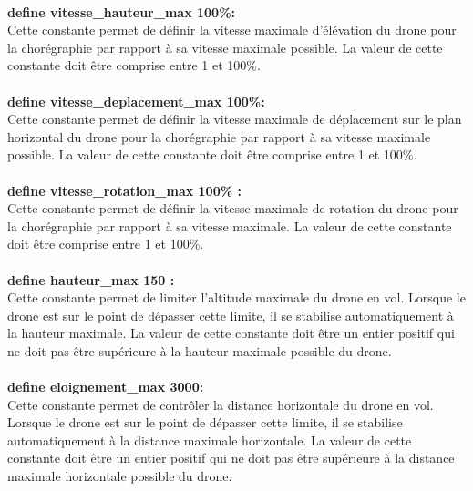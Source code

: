 \documentclass[12pt]{article}
\begin{document}
			\paragraph{}\textbf{define vitesse\_hauteur\_max 100\%: } \\
				Cette constante permet de définir la vitesse maximale d'élévation du drone pour la chorégraphie par rapport à sa vitesse maximale possible. \newline
				La valeur de cette constante doit être comprise entre 1 et 100\%.
			\paragraph{}\textbf{define vitesse\_deplacement\_max 100\%:}\\
				Cette constante permet de définir la vitesse maximale de déplacement sur le plan horizontal du drone pour la chorégraphie par rapport à sa vitesse maximale possible. \newline
				La valeur de cette constante doit être comprise entre 1 et 100\%.
			\paragraph{}\textbf{define vitesse\_rotation\_max 100\% :}\\
				Cette constante permet de définir la vitesse maximale de rotation du drone pour la chorégraphie par rapport à sa vitesse maximale. \newline
				La valeur de cette constante doit être comprise entre 1 et 100\%.
			\paragraph{}\textbf{define hauteur\_max 150 :}\\
				Cette constante permet de limiter l'altitude maximale du drone en vol. Lorsque le drone est sur le point de dépasser cette limite, il se stabilise automatiquement à la hauteur maximale. \newline
				La valeur de cette constante doit être un entier positif qui ne doit pas être supérieure à la hauteur maximale possible du drone.
			\paragraph{}\textbf{define eloignement\_max 3000:}\\
				Cette constante permet de contrôler la distance horizontale du drone en vol. Lorsque le drone est sur le point de dépasser cette limite, il se stabilise automatiquement à la distance maximale horizontale. \newline
				La valeur de cette constante doit être un entier positif qui ne doit pas être supérieure à la distance maximale horizontale possible du drone.
\end{document}

